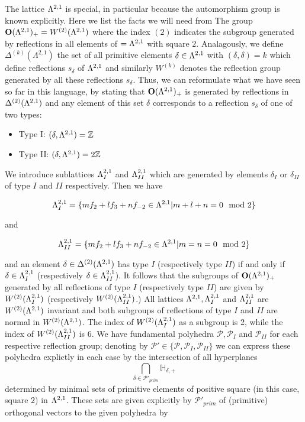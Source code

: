 \documentclass[9pt]{amsart} \usepackage[utf8]{inputenc}
\newcommand{\Z}{\mathbb{Z}} \newcommand{\C}{\mathbb{C}}
\newcommand{\Orth}{\mathbf{O}}
\newcommand{\Hpl}{\mathbb{H}}
\newcommand{\Poly}{\mathcal{P}}
\begin{document}
The lattice $\Lambda^{2,1}$ is special, in particular because the
automorphism group is known explicitly. Here we list the facts we will
need from \cite{NIKULIN}
The group $\Orth(\La^{2,1})_+ = W^{(2)}(\La^{2,1})$ where the index
$(2)$ indicates the subgroup generated by reflections in all elements of
$=\Lambda^{2,1}$ with square $2$. Analagously, we define
$\Delta^{(k)}(\Lambda^{2,1})$ the set of all primitive elements
$\delta \in \Lambda^{2,1}$ with $(\delta,\delta) = k$ which define
reflections $s_{\delta}$ of $\Lambda^{2,1}$ and similarly $W^{(k)}$ denotes
the reflection group generated by all these reflections $s_{\delta}$.
Thus, we can reformulate what we have seen so far in this language, by
stating that $\Orth(\La^{2,1})_+$ is generated by reflections in
$\Delta^{(2)}(\Lambda^{2,1})$ and any element of this set $\delta$
corresponds to a reflection $s_{\delta}$ of one of two types:
\begin{itemize}
\item Type I: $(\delta, \La^{2,1}) = \Z$
\item Type II: $(\delta, \La^{2,1}) = 2\Z$
\end{itemize}

We introduce sublattices $\Lambda^{2,1}_I$ and $\Lambda^{2,1}_{II}$ which are
generated by elements $\delta_I$ or $\delta_{II}$ of type $I$ and $II$
respectively. Then we have

$$\Lambda^{2,1}_I = \{m f_2 + l f_3 + n f_{-2} \in \Lambda^{2,1} | m + l + n = 0 \mod 2\}$$

and

$$\Lambda^{2,1}_{II} = \{m f_2 + l f_3 + n f_{-2} \in \Lambda^{2,1} | m = n =  0 \mod 2\}$$

and an element $\delta \in \Delta^{(2)}(\Lambda^{2,1})$ has type $I$
(respectively type $II$) if and only if $\delta \in \Lambda^{2,1}_I$
(respectively $\delta \in \Lambda^{2,1}_{II}$). It follows that the
subgroups of $\Orth(\La^{2,1})_+$ generated by all reflections of type
$I$ (respectively type $II$) are given by $W^{(2)}(\Lambda^{2,1}_I)$
(respectively $W^{(2)}(\Lambda^{2,1}_{II})$.) All lattices $\Lambda^{2,1},
 \Lambda^{2,1}_I$ and $\Lambda^{2,1}_{II}$ are $W^{(2)}(\Lambda^{2,1})$ invariant and
 both subgroups of reflections of type $I$ and $II$ are normal in
 $W^{(2)}(\Lambda^{2,1})$. The index of $W^{(2)}(\Lambda^{2,1}_I)$ as a subgroup
 is 2, while the index of $W^{(2)}(\Lambda^{2,1}_{II})$ is $6$. We have
 fundamental polyhedra $\Poly, \Poly_I$ and $\Poly_{II}$ for each
 respective reflection group; denoting by $\Poly' \in \{\Poly, \Poly_I,
 \Poly_{II}\}$ we can express these polyhedra explictly in each case by
 the intersection of all hyperplanes $$\displaystyle\bigcap_{\delta \in
 \Poly'_{prim}} \Hpl_{\delta,+}$$ determined by minimal sets of
 primitive elements of positive square (in this case, square $2$) in
 $\Lambda^{2,1}$. These sets are given explicitly by $\Poly'_{prim}$ of
 (primitive) orthogonal vectors to the given polyhedra by
\end{document}
